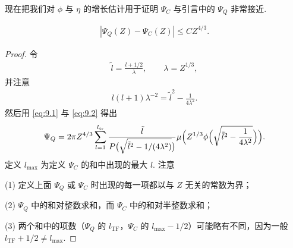 现在把我们对 $\phi$ 与 $\eta$ 的增长估计用于证明 $\Psi_C$ 与引言中的 $\Psi_Q$ 非常接近.

\begin{lemma}\label{lem:9.19}
\begin{align*}
  |\Psi_{Q}(Z)-\Psi_{C}(Z)|\leq C Z^{4/3}.
\end{align*}
\end{lemma}

\begin{proof}
令
\begin{align*}
  \tilde{l}=\frac{l+1/2}{\lambda},\qquad \lambda=Z^{1/3},
\end{align*}
并注意
\begin{align*}
  l(l+1)\lambda^{-2}=\tilde{l}^{2}-\frac{1}{4\lambda^{2}}.
\end{align*}
然后用 \eqref{eq:9.1} 与 \eqref{eq:9.2} 得出
\begin{align*}
  \Psi_{Q}=2\pi Z^{4/3}\sum_{l=1}^{l_{\mathrm{tr}}}
  \frac{\tilde{l}}{P\bigl(\sqrt{\tilde{l}^{2}-1/(4\lambda^{2})}\bigr)}
  \mu\Bigl(Z^{1/3}\phi\Bigl(\sqrt{\tilde{l}^{2}-\frac{1}{4\lambda^{2}}}\Bigr)\Bigr).
\end{align*}
定义 $l_{\max}$ 为定义 $\Psi_{C}$ 的和中出现的最大 $l$. 注意

(1) 定义上面 $\Psi_Q$ 或 $\Psi_C$ 时出现的每一项都以与 $Z$ 无关的常数为界；

(2) $\Psi_Q$ 中的和对整数求和，而 $\Psi_C$ 中的和对半整数求和；

(3) 两个和中的项数（$\Psi_Q$ 的 $l_{\mathrm{TF}}$，$\Psi_C$ 的 $l_{\max} - 1/2$）可能略有不同，因为一般 $l_{\mathrm{TF}} + 1/2 \neq l_{\max}$.


\end{proof}
